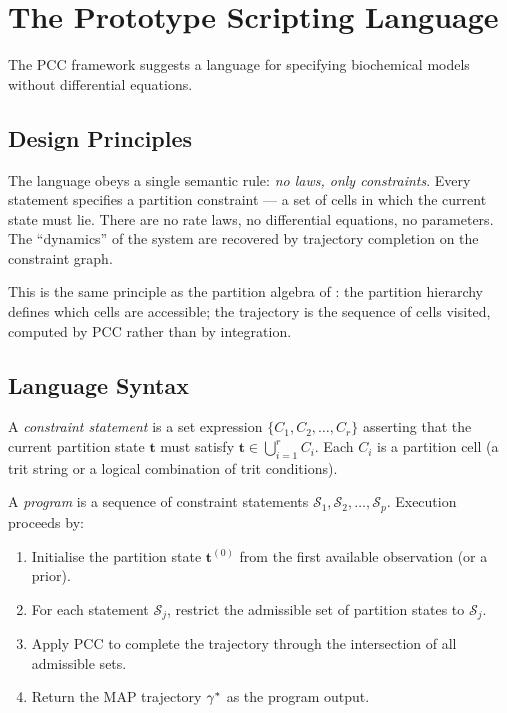 \section{The Prototype Scripting Language}
\label{sec:scripting}

The PCC framework suggests a language for specifying biochemical models
without differential equations.

\subsection{Design Principles}

The language obeys a single semantic rule: \emph{no laws, only constraints}.
Every statement specifies a partition constraint --- a set of cells in which the
current state must lie.  There are no rate laws, no differential equations, no
parameters.  The ``dynamics'' of the system are recovered by trajectory
completion on the constraint graph.

This is the same principle as the partition algebra of : the
partition hierarchy defines which cells are accessible; the trajectory is the
sequence of cells visited, computed by PCC rather than by integration.

\subsection{Language Syntax}

\begin{definition}
\label{def:constraint-stmt}
A \emph{constraint statement} is a set expression
$\{C_1, C_2, \ldots, C_r\}$ asserting that the current partition state
$\mathbf{t}$ must satisfy $\mathbf{t} \in \bigcup_{i=1}^r C_i$.  Each $C_i$
is a partition cell (a trit string or a logical combination of trit conditions).
\end{definition}

\begin{definition}
\label{def:prog-exec}
A \emph{program} is a sequence of constraint statements
$\mathcal{S}_1, \mathcal{S}_2, \ldots, \mathcal{S}_p$.  Execution proceeds by:
\begin{enumerate}[label=(\arabic*)]
    \item Initialise the partition state $\mathbf{t}^{(0)}$ from the first
          available observation (or a prior).
    \item For each statement $\mathcal{S}_j$, restrict the admissible set of
          partition states to $\mathcal{S}_j$.
    \item Apply PCC to complete the trajectory through the intersection of all
          admissible sets.
    \item Return the MAP trajectory $\gamma^*$ as the program output.
\end{enumerate}
\end{definition}

